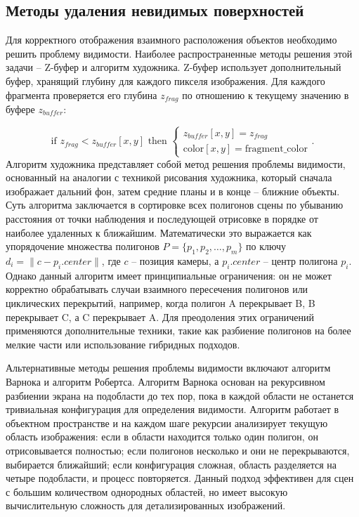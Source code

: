 \subsection{Методы удаления невидимых поверхностей}
Для корректного отображения взаимного расположения объектов необходимо решить проблему видимости. Наиболее распространенные методы решения этой задачи -- Z-буфер и алгоритм художника. Z-буфер использует дополнительный буфер, хранящий глубину для каждого пикселя изображения. Для каждого фрагмента проверяется его глубина $z_{frag}$ по отношению к текущему значению в буфере $z_{buffer}$:


\begin{equation}
\text{if } z_{frag} < z_{buffer}[x,y] \text{ then }
\begin{cases}
z_{buffer}[x,y] = z_{frag} \\
\text{color}[x,y] = \text{fragment\_color}
\end{cases}.
\end{equation}
Алгоритм художника представляет собой метод решения проблемы видимости, основанный на аналогии с техникой рисования художника, который сначала изображает дальний фон, затем средние планы и в конце -- ближние объекты. Суть алгоритма заключается в сортировке всех полигонов сцены по убыванию расстояния от точки наблюдения и последующей отрисовке в порядке от наиболее удаленных к ближайшим. Математически это выражается как упорядочение множества полигонов $P = \{p_1, p_2, \dots, p_m\}$ по ключу $d_i = \|c - p_i.center\|$, где $c$ -- позиция камеры, а $p_i.center$ -- центр полигона $p_i$. Однако данный алгоритм имеет принципиальные ограничения: он не может корректно обрабатывать случаи взаимного пересечения полигонов или циклических перекрытий, например, когда полигон A перекрывает B, B перекрывает C, а C перекрывает A. Для преодоления этих ограничений применяются дополнительные техники, такие как разбиение полигонов на более мелкие части или использование гибридных подходов.

Альтернативные методы решения проблемы видимости включают алгоритм Варнока и алгоритм Робертса. Алгоритм Варнока основан на рекурсивном разбиении экрана на подобласти до тех пор, пока в каждой области не останется тривиальная конфигурация для определения видимости. Алгоритм работает в объектном пространстве и на каждом шаге рекурсии анализирует текущую область изображения: если в области находится только один полигон, он отрисовывается полностью; если полигонов несколько и они не перекрываются, выбирается ближайший; если конфигурация сложная, область разделяется на четыре подобласти, и процесс повторяется. Данный подход эффективен для сцен с большим количеством однородных областей, но имеет высокую вычислительную сложность для детализированных изображений.

